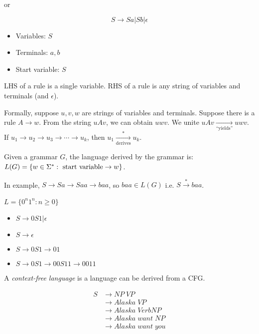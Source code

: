 or

\begin{equation*}
    S \rightarrow Sa|Sb|\epsilon
\end{equation*}

\begin{itemize}
    \item Variables: $S$
    \item Terminals: $a, b$
    \item Start variable: $S$
\end{itemize}

LHS of a rule is a single variable. RHS of a rule is any string of variables and terminals (and $\epsilon$).

Formally, suppose $u, v, w$ are strings of variables and terminals. Suppose there is a rule $A \rightarrow w$. From the string $uAv$, we can obtain $uwv$. We unite $uAv \xrightarrow[\text{``yields''}]{} uwv$. If $u_1 \rightarrow u_2 \rightarrow u_3 \rightarrow \cdots \rightarrow u_k$, then $u_1 \xrightarrow[\text{derives}]{*} u_k$.

Given a grammar $G$, the language derived by the grammar is: $L(G) = \left \{ w \in \Sigma^*: \text{ start variable} \rightarrow w \right \}$.

In example, $S \rightarrow Sa \rightarrow Saa \rightarrow baa$, so $baa \in L(G)$ i.e. $S \xrightarrow[]{*} baa$.

\begin{example}
    $L = \{0^n1^n: n \geq 0\}$

    \begin{itemize}
        \item $S \rightarrow 0S1|\epsilon$
        \item $S \rightarrow \epsilon$
        \item $S \rightarrow 0S1 \rightarrow 01$
        \item $S \rightarrow 0S1 \rightarrow 00S11 \rightarrow 0011$
    \end{itemize}
\end{example}

A \emph{context-free language} is a language can be derived from a CFG.

\begin{align*}
  S
  &\rightarrow NP \; VP \\
  &\rightarrow Alaska \; VP \\
  &\rightarrow Alaska \; Verb NP \\
  &\rightarrow Alaska \; want \; NP\\
  &\rightarrow Alaska \; want \; you
\end{align*}

